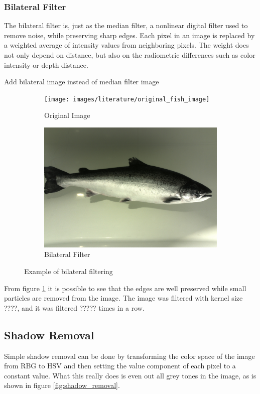 \subsubsection{Bilateral Filter}
The bilateral filter is, just as the median filter, a nonlinear digital filter used to remove noise, while preserving sharp edges. Each pixel in an image is replaced by a weighted average of intensity values from neighboring pixels. The weight does not only depend on distance, but also on the radiometric differences such as color intensity or depth distance. 

{\color{red}Add bilateral image instead of median filter image}

\begin{figure}[h]
    \centering
    \begin{subfigure}{0.5\textwidth}
        \centering
        \texttt{[image: images/literature/original\_fish\_image]}
        \caption{Original Image}
    \end{subfigure}%
    \begin{subfigure}{.5\textwidth}
        \centering
        \includegraphics[width=.9\linewidth]{images/literature/median_filter}
        \caption{Bilateral Filter}
    \end{subfigure}
    \caption{Example of bilateral filtering}
    \label{fig:bilateral_filter}
\end{figure}

From figure \ref{fig:bilateral_filter} it is possible to see that the edges are well preserved while small particles are removed from the image. The image was filtered with kernel size {\color{red}????}, and it was filtered {\color{red}?????} times in a row.


\subsection{Shadow Removal}
Simple shadow removal can be done by transforming the color space of the image from RBG to HSV and then setting the value component of each pixel to a constant value. What this really does is even out all grey tones in the image, as is shown in figure \ref{fig:shadow_removal}.

